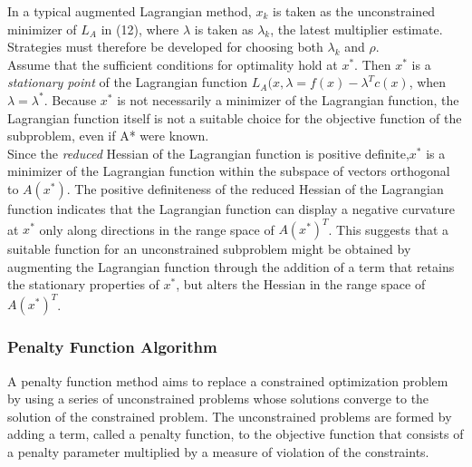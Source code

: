 In a typical augmented Lagrangian method, $x_k$ is taken as the unconstrained
minimizer of $L_A$ in (12), where $\lambda$ is taken as $\lambda_k$, the latest multiplier estimate. Strategies must therefore be developed for choosing both $\lambda_k$ and $\rho$.\\

\noindent Assume that the sufficient conditions for optimality hold at $x^*$. Then $x^*$ is a \textit{stationary point} of the Lagrangian function $L_A(x, \lambda = f(x) - \lambda^Tc(x)$, when $\lambda = \lambda^*$. Because $x^*$ is not necessarily a minimizer of the Lagrangian function, the Lagrangian function itself is not a suitable choice for the objective function of the subproblem, even if A* were known.\\

\noindent Since the \textit{reduced} Hessian of the Lagrangian function is positive definite,$x^*$ is a minimizer of the Lagrangian function within the subspace of vectors orthogonal to $A(x^*)$. The positive definiteness of the reduced Hessian of the Lagrangian function indicates that the Lagrangian function can display a negative curvature at $x^*$ only along directions in the range space of $A(x^*)^T$. This suggests that a suitable function for an unconstrained subproblem might be obtained by augmenting the Lagrangian function through the addition of a term that retains the stationary properties of $x^*$, but alters the Hessian in the range space of $A(x^*)^T$.\cite{KKT11, Haestene2, flect}

\subsubsection{Penalty Function Algorithm}
A penalty function method aims to replace a constrained optimization problem by using a series of unconstrained problems whose solutions converge to the solution of the constrained problem. The unconstrained problems are formed by adding a term, called a penalty function, to the objective function that consists of a penalty parameter multiplied by a measure of violation of the constraints.

